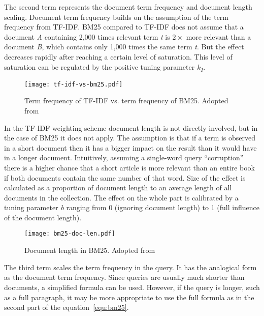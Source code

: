     The second term represents the document term frequency and document length scaling. Document term frequency builds on the assumption of the term frequency from TF-IDF. BM25 compared to TF-IDF does not assume that a document \emph{A} containing 2,000 times relevant term \emph{t} is $2\times$ more relevant than a document \emph{B}, which contains only 1,000 times the same term \emph{t}. But the effect decreases rapidly after reaching a certain level of saturation. This level of saturation can be regulated by the positive tuning parameter \emph{k\textsubscript{1}}.
    \begin{figure}[H]
        \texttt{[image: tf-idf-vs-bm25.pdf]}
        \centering
        \caption[Term frequency of TF-IDF vs. term frequency of BM25]{Term frequency of TF-IDF vs. term frequency of BM25. Adopted from~\parencite{tfidf-vs-bm25}}
        \label{fig:tf-idf-vs-bm25}
    \end{figure}

    \noindent In the TF-IDF weighting scheme document length is not directly involved, but in the case of BM25 it does not apply. The assumption is that if a term is observed in a short document then it has a bigger impact on the result than it would have in a longer document. Intuitively, assuming a single-word query \enquote{corruption} there is a higher chance that a short article is more relevant than an entire book if both documents contain the same number of that word. Size of the effect is calculated as a proportion of document length to an average length of all documents in the collection. The effect on the whole part is calibrated by a tuning parameter \emph{b} ranging from 0 (ignoring document length) to 1 (full influence of the document length).
    \begin{figure}[H]
        \texttt{[image: bm25-doc-len.pdf]}
        \centering
        \caption[Document length in BM25]{Document length in BM25. Adopted from~\parencite{tfidf-vs-bm25}}
        \label{fig:doc-len-bm25}
    \end{figure}

    The third term scales the term frequency in the query. It has the analogical
    form as the document term frequency. Since queries are usually much shorter than documents, a simplified formula can be used. However, if the query is longer, such as a full paragraph, it may be more appropriate to use the full formula as in the second part of the equation~\ref{equ:bm25}.~\parencite{manning2008introduction}
    
